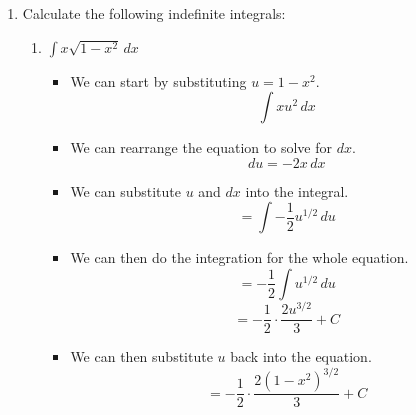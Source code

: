 \documentclass[12pt]{article}
\begin{document}
\begin{enumerate}[leftmargin=\labelsep]
    \item Calculate the following indefinite integrals:
    \begin{enumerate}
        \item $\displaystyle{\int x \sqrt{1-x^2} \, dx}$
        \begin{itemize}[label={}]
            \item We can start by substituting $u = 1-x^2$.
            \begin{equation*}
                \int xu^2 \, dx
            \end{equation*}
            \item We can rearrange the equation to solve for $dx$.
            \begin{equation*}
                du = -2x \, dx
            \end{equation*}
            \item We can substitute $u$ and $dx$ into the integral.
            \begin{equation*}
                = \int -\frac{1}{2} u^{1/2} \, du
            \end{equation*}
            \item We can then do the integration for the whole equation.
            \begin{equation*}
                = -\frac{1}{2} \int u^{1/2} \, du
            \end{equation*}
            \begin{equation*}
                = -\frac{1}{2} \cdot \frac{2u^{3/2}}{3} + C
            \end{equation*}
            \item We can then substitute $u$ back into the equation.
            \begin{equation*}
                = -\frac{1}{2} \cdot \frac{2(1-x^2)^{3/2}}{3} + C
            \end{equation*}
        \end{itemize}


\end{enumerate}
\end{enumerate}
\end{document}
